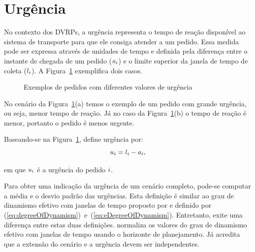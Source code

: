 





\section{Urgência}\label{sec:urgencia}

No contexto dos DVRPs, a urgência representa o tempo de reação disponível ao 
sistema de transporte para que ele consiga atender a um pedido.
Essa medida pode ser expressa através de unidades de tempo e definida pela 
diferença entre o instante de chegada de um pedido ($a_i$) 
e o limite superior da janela de tempo de coleta 
($l_i$).
A Figura~\ref{fig:van_lon_measures_2016_urgency} exemplifica dois casos.

\begin{figure}[H]
    \begin{center}
        \caption{Exemplos de pedidos com diferentes valores de urgência 
                 \cite{van_lon_measures_2016}}
        \label{fig:van_lon_measures_2016_urgency}
    \end{center} 
\end{figure}

No cenário da Figura~\ref{fig:van_lon_measures_2016_urgency}(a) temos o exemplo
de um pedido com grande urgência, ou seja, menor tempo de reação.
Já no caso da Figura~\ref{fig:van_lon_measures_2016_urgency}(b) o tempo de 
reação é menor, portanto o pedido é menos urgente.

Baseando-se na Figura~\ref{fig:van_lon_measures_2016_urgency}, 
 define urgência por:
%
\begin{equation}
    u_i = l_i - a_i,
    \label{eq:van_lon_measures_2016_urgency}
\end{equation}

\noindent em que $u_i$ é a urgência do pedido $i$.

Para obter uma indicação da urgência de um cenário completo, pode-se computar a
média e o desvio padrão das urgências. 
Esta definição é similar ao grau de dinamismo efetivo com janelas de tempo 
proposto por  e definido por
(\ref{eq:degreeOfDynamism})~e~(\ref{eq:eDegreeOfDynamism}).
Entretanto, exite uma diferença entre estas duas definições.
 normaliza os valores do grau de dinamismo
efetivo com janelas de tempo usando o horizonte de planejamento.  
Já  acredita que a extensão do cenário e
a urgência devem ser independentes.


